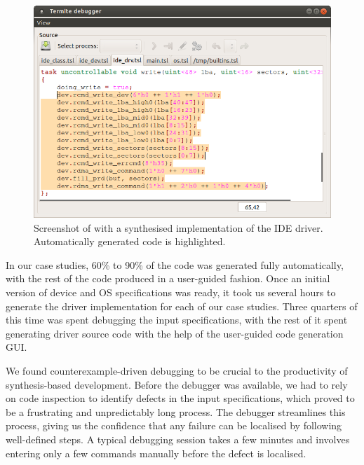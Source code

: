 \begin{figure}
    \center
    \includegraphics[width=\linewidth]{imgs/screenshot_write.png}
    \caption{Screenshot of \termite with a synthesised implementation of the IDE driver.  Automatically generated code is highlighted.}
    \label{f:screenshot_write}
\end{figure}

In our case studies, 60\% to 90\% of the code was generated fully automatically, with the rest of the code produced in a user-guided fashion.  Once an initial version of device and OS specifications was ready, it took us several hours to generate the driver implementation for each of our case studies.  Three quarters of this time was spent debugging the input specifications, with the rest of it spent generating driver source code with the help of the user-guided code generation GUI.

We found counterexample-driven debugging to be crucial to the productivity of synthesis-based development.  Before the debugger was available, we had to rely on code inspection to identify defects in the input specifications, which proved to be a frustrating and unpredictably long process.  The \termite debugger streamlines this process, giving us the confidence that any failure can be localised by following well-defined steps.  A typical debugging session takes a few minutes and involves entering only a few commands manually before the defect is localised. 

%
%
%

